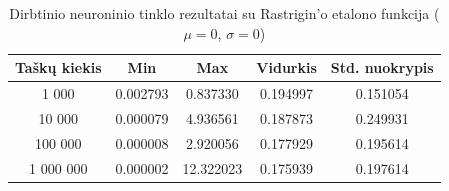 \begin{table}[H]
    \centering
    \begin{tabular}{|c|c|c|c|c|}
        \hline
        \textbf{Taškų kiekis} & \textbf{Min} & \textbf{Max} & \textbf{Vidurkis} & \textbf{Std. nuokrypis} \\ \hline
        1 000        & 0.002793 & 0.837330 & 0.194997 & 0.151054 \\ \hline
        10 000       & 0.000079 & 4.936561 & 0.187873 & 0.249931 \\ \hline
        100 000      & 0.000008 & 2.920056 & 0.177929 & 0.195614 \\ \hline
        1 000 000    & 0.000002 & 12.322023 & 0.175939 & 0.197614 \\ \hline
    \end{tabular}
    \caption{Dirbtinio neuroninio tinklo rezultatai su Rastrigin'o etalono funkcija ($\mu = 0$, $\sigma = 0$)}
\end{table}